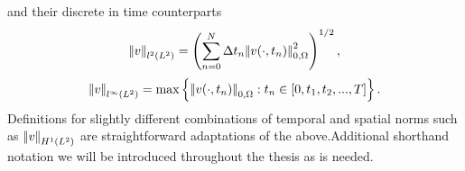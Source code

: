 and their discrete in time counterparts
\begin{equation*}
  {\left\vert\kern-0.25ex\left\vert v \right\vert\kern-0.25ex\right\vert}_{l^{2}(L^{2})} = \left( \sum_{n=0}^{N} \Delta t_{n} {\left\vert\kern-0.25ex\left\vert v(\cdot,t_{n}) \right\vert\kern-0.25ex\right\vert}_{0,\Omega}^{2} \right)^{1/2}            ,                                                                                                                                                                                                                                                                                                                                                                                                                                                                                                                                                                                                                                                                                                                                                                                                                                                                                                                                                                                                                                                                                         \end{equation*}
   \begin{equation*}
  {\left\vert\kern-0.25ex\left\vert v \right\vert\kern-0.25ex\right\vert}_{l^{\infty}(L^{2})} =  \max\left\lbrace {\left\vert\kern-0.25ex\left\vert v(\cdot,t_{n}) \right\vert\kern-0.25ex\right\vert}_{0,\Omega} : t_{n} \in [0,t_{1},t_{2},...,T] \right\rbrace.                                                                                                                                                                                                                                                                                                                                                                                                                                                                                                                                                                                                                                                                                                                                                                                                                                                                                                                                                                                                                                                                                           \end{equation*} Definitions for slightly different combinations of temporal and spatial norms such as ${\left\vert\kern-0.25ex\left\vert v \right\vert\kern-0.25ex\right\vert}_{H^{1}(L^{2})}$ are straightforward adaptations of the above.Additional shorthand notation we will be introduced throughout the thesis as is needed.



